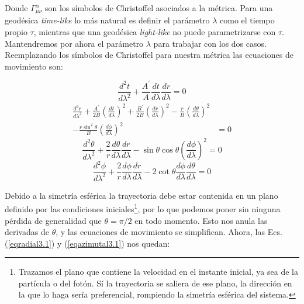 Donde $\Gamma^\alpha_{\mu\nu}$ son los símbolos de Christoffel asociados a la métrica. Para una geodésica \textit{time-like} lo más natural es definir el parámetro $\lambda$ como el tiempo propio $\tau$, mientras que una geodésica \textit{light-like} no puede parametrizarse con $\tau$. Mantendremos por ahora el parámetro $\lambda$ para trabajar con los dos casos. Reemplazando los símbolos de Christoffel para nuestra métrica las ecuaciones de movimiento son:
 
\begin{equation}
    \frac{d^2 t}{d \lambda^2} + \frac{A^\prime}{A} \frac{d t}{d \lambda} \frac{d r}{d \lambda} = 0
\label{eqt3.1}
\end{equation}
\begin{equation}
\begin{split}
    \frac{d^2 r}{d \lambda^2} + \frac{A^\prime}{2B} \left(\frac{d t}{d \lambda}\right)^2 + \frac{B^\prime}{2B} \left(\frac{d r}{d \lambda}\right)^2 - \frac{r}{B} \left(\frac{d \theta}{d \lambda}\right)^2 &\\- \frac{r \sin^2{\theta}}{B} \left(\frac{d \phi}{d \lambda}\right)^2 &= 0
\label{eqradial3.1}
\end{split}
\end{equation}
\begin{equation}
    \frac{d^2 \theta}{d \lambda^2} + \frac{2}{r} \frac{d \theta}{d \lambda} \frac{d r}{d \lambda} - \sin{\theta}\cos{\theta} \left(\frac{d \phi}{d \lambda}\right)^2= 0
\end{equation}
\begin{equation}
    \frac{d^2 \phi}{d \lambda^2} + \frac{2}{r} \frac{d \phi}{d \lambda} \frac{d r}{d \lambda} - 2\cot{\theta}\frac{d \phi}{d \lambda} \frac{d \theta}{d \lambda}= 0
\label{eqazimutal3.1}
\end{equation}

Debido a la simetría esférica la trayectoria debe estar contenida en un plano definido por las condiciones iniciales\footnote{Trazamos el plano que contiene la velocidad en el instante inicial, ya sea de la partícula o del fotón. Sí la trayectoria se saliera de ese plano, la dirección en la que lo haga sería preferencial, rompiendo la simetría esférica del sistema.}, por lo que podemos poner sin ninguna pérdida de generalidad que $\theta=\pi/2$ en todo momento. Esto nos anula las derivadas de $\theta$, y las ecuaciones de movimiento se simplifican. Ahora, las Ecs. (\ref{eqradial3.1}) y (\ref{eqazimutal3.1}) nos quedan:

